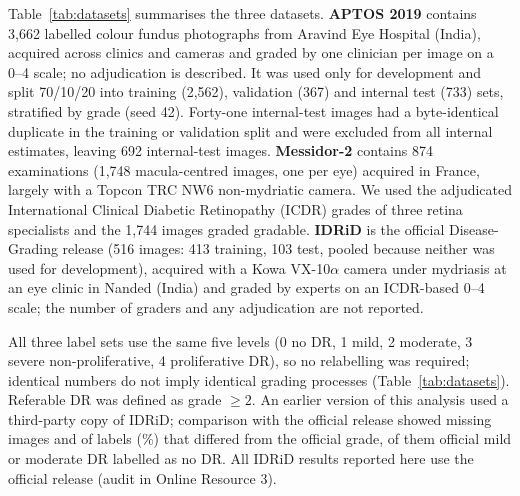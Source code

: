 \documentclass[pdflatex,sn-basic,Numbered]{sn-jnl}
\begin{document}
Table~\ref{tab:datasets} summarises the three datasets.
\textbf{APTOS 2019} \cite{aptos2019} contains 3,662 labelled colour fundus photographs from Aravind Eye Hospital (India), acquired across clinics and cameras and graded by one clinician per image on a 0--4 scale; no adjudication is described. It was used only for development and split 70/10/20 into training (2,562), validation (367) and internal test (733) sets, stratified by grade (seed 42). Forty-one internal-test images had a byte-identical duplicate in the training or validation split and were excluded from all internal estimates, leaving 692 internal-test images.
\textbf{Messidor-2} \cite{decenciere2014,abramoff2013} contains 874 examinations (1,748 macula-centred images, one per eye) acquired in France, largely with a Topcon TRC NW6 non-mydriatic camera. We used the adjudicated International Clinical Diabetic Retinopathy (ICDR) grades of three retina specialists \cite{krause2018} and the 1,744 images graded gradable.
\textbf{IDRiD} \cite{porwal2018,porwal2020} is the official Disease-Grading release (516 images: 413 training, 103 test, pooled because neither was used for development), acquired with a Kowa VX-10$\alpha$ camera under mydriasis at an eye clinic in Nanded (India) and graded by experts on an ICDR-based 0--4 scale; the number of graders and any adjudication are not reported.

All three label sets use the same five levels (0 no DR, 1 mild, 2 moderate, 3 severe non-proliferative, 4 proliferative DR), so no relabelling was required; identical numbers do not imply identical grading processes (Table~\ref{tab:datasets}). Referable DR was defined as grade $\ge2$. An earlier version of this analysis used a third-party copy of IDRiD; comparison with the official release showed  missing images and  of  labels (\%) that differed from the official grade,  of them official mild or moderate DR labelled as no DR. All IDRiD results reported here use the official release (audit in Online Resource 3).
\end{document}
